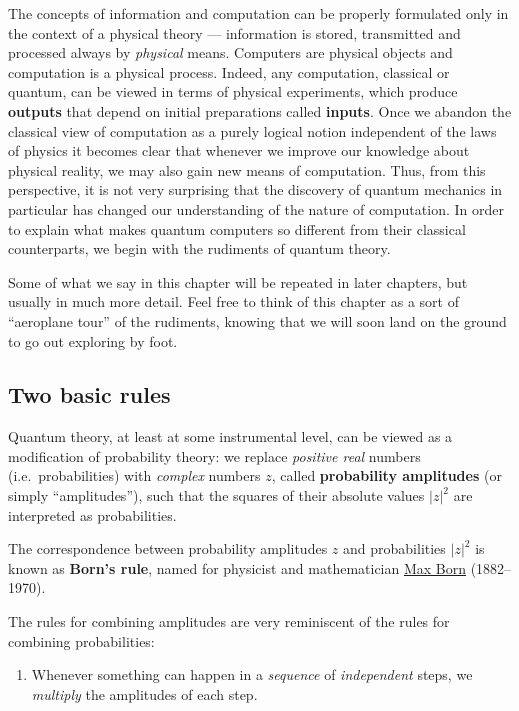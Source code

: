 \documentclass[fleqn]{article}
\providecommand{\tightlist}{%
  \setlength{\itemsep}{0pt}\setlength{\parskip}{0pt}}
\newenvironment{idea}{\noindent}{\medskip}
\begin{document}
The concepts of information and computation can be properly formulated only in the context of a physical theory --- information is stored, transmitted and processed always by \emph{physical} means.
Computers are physical objects and computation is a physical process.
Indeed, any computation, classical or quantum, can be viewed in terms of physical experiments, which produce \textbf{outputs} that depend on initial preparations called \textbf{inputs}.
Once we abandon the classical view of computation as a purely logical notion independent of the laws of physics it becomes clear that whenever we improve our knowledge about physical reality, we may also gain new means of computation.
Thus, from this perspective, it is not very surprising that the discovery of quantum mechanics in particular has changed our understanding of the nature of computation.
In order to explain what makes quantum computers so different from their classical counterparts, we begin with the rudiments of quantum theory.

Some of what we say in this chapter will be repeated in later chapters, but usually in much more detail.
Feel free to think of this chapter as a sort of ``aeroplane tour'' of the rudiments, knowing that we will soon land on the ground to go out exploring by foot.

\hypertarget{two-basic-rules}{%
\subsection{Two basic rules}\label{two-basic-rules}}

Quantum theory, at least at some instrumental level, can be viewed as a modification of probability theory: we replace \emph{positive real} numbers (i.e.~probabilities) with \emph{complex} numbers \(z\), called \textbf{probability amplitudes} (or simply ``amplitudes''), such that the squares of their absolute values \(|z|^2\) are interpreted as probabilities.

\begin{idea}
The correspondence between probability amplitudes \(z\) and probabilities \(|z|^2\) is known as \textbf{Born's rule}, named for physicist and mathematician \href{https://en.wikipedia.org/wiki/Max_Born}{Max Born} (1882--1970).

\end{idea}

The rules for combining amplitudes are very reminiscent of the rules for combining probabilities:

\begin{enumerate}
\def\labelenumi{\arabic{enumi}.}
\tightlist
\item
  Whenever something can happen in a \emph{sequence} of \emph{independent} steps, we \emph{multiply} the amplitudes of each step.
\end{enumerate}
\end{document}
